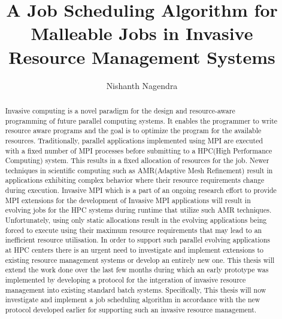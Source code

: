 \documentclass{article}
\begin{document}
\title{A Job Scheduling Algorithm for Malleable Jobs in Invasive Resource Management Systems}
\author{Nishanth Nagendra}

\maketitle

\begin{abstract}
Invasive computing is a novel paradigm for the design and resource-aware programming of future parallel computing systems. It enables the programmer to write resource aware programs and the goal is to optimize the program for the available resources. Traditionally, parallel applications implemented using MPI are executed with a fixed number of MPI processes before submitting to a HPC(High Performance Computing) system. This results in a fixed allocation of resources for the job. Newer techniques in scientific computing such as AMR(Adaptive Mesh Refinement) result in applications exhibiting complex behavior where their resource requirements change during execution. Invasive MPI which is a part of an ongoing research effort to provide MPI extensions for the development of Invasive MPI applications will result in evolving jobs for the HPC systems during runtime that utilize such AMR techniques. Unfortunately, using only static allocations result in the evolving applications being forced to execute using their maximum resource requirements that may lead to an inefficient resource utilisation. In order to support such parallel evolving applications at HPC centers there is an urgent need to investigate and implement extensions to existing resource management systems or develop an entirely new one. This thesis will extend the work done over the last few months during which an early prototype was implemented by developing a protocol for the intgeration of invasive resource management into existing standard batch systems. Specifically, This thesis will now investigate and implement a job scheduling algorithm in accordance with the new protocol developed earlier for supporting such an invasive resource management.\par
\end{abstract}
\end{document}
